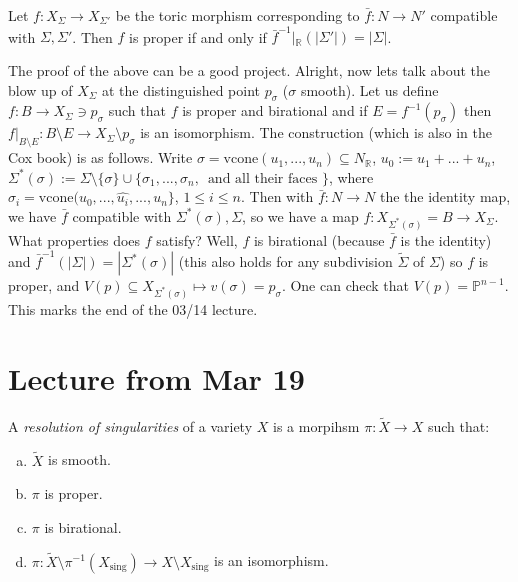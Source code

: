\documentclass[a4paper,12pt]{amsart}
\newcommand{\R}{\ensuremath{\mathbb{R}}}
\begin{document}
\begin{Theorem}
    Let $f: X_\Sigma \to X_{\Sigma'}$ be the toric morphism corresponding to $\bar{f} : N \to N'$ compatible with $\Sigma, \Sigma'$. Then $f$ is proper if and only if $\bar{f}^{-1}|_{\R} (|\Sigma'|) = |\Sigma|$.
\end{Theorem}
\noindent The proof of the above can be a good project. Alright, now lets talk about the blow up of $X_\Sigma$ at the distinguished point $p_\sigma$ ($\sigma$ smooth). Let us define $f: B \to X_{\Sigma} \ni p_{\sigma}$ such that $f$ is proper and birational and if $E = f^{-1}(p_\sigma)$ then $f|_{B \setminus E} : B \setminus E \to X_{\Sigma} \setminus p_\sigma$ is an isomorphism. The construction (which is also in the Cox book) is as follows. Write $\sigma = \text{vcone}(u_1,...,u_n) \subseteq N_\R$, $u_0 := u_1 + ... + u_n$, $\Sigma^* (\sigma) := \Sigma \setminus \{\sigma\} \cup \{\sigma_1,...,\sigma_n, \, \text{ and all their faces } \}$, where $\sigma_i = \text{vcone} (u_0, ..., \hat{u_i}, ..., u_n \}$, $1 \leq i \leq n$. Then with $\bar{f}: N \to N$ the the identity map, we have $\bar{f}$ compatible with $\Sigma^*(\sigma), \Sigma$, so we have a map $f: X_{\Sigma^*(\sigma)} = B \to X_{\Sigma}$. What properties does $f$ satisfy? Well, $f$ is birational (because $\bar{f}$ is the identity) and $\bar{f}^{-1}(|\Sigma|) = |\Sigma^*(\sigma)|$ (this also holds for any subdivision $\widetilde{\Sigma}$ of $\Sigma$) so $f$ is proper, and $V(p) \subseteq X_{\Sigma^*(\sigma)} \mapsto v(\sigma) = p_\sigma$. One can check that $V(p) = \mathbb{P}^{n-1}$. This marks the end of the 03/14 lecture.

\newpage
\section{Lecture from Mar 19}

\begin{definition}
	A \textit{resolution of singularities} of a variety $X$ is a morpihsm $\pi:\tilde{X}\rightarrow X$ such that:
	\begin{enumerate}[(a)]
		\item $\tilde{X}$ is smooth.
		\item $\pi$ is proper.
		\item $\pi$ is birational.
		\item $\pi:\tilde{X}\setminus\pi^{-1}(X_\text{sing})\rightarrow X\setminus X_\text{sing}$ is an isomorphism.
	\end{enumerate}
\end{definition}
\end{document}
